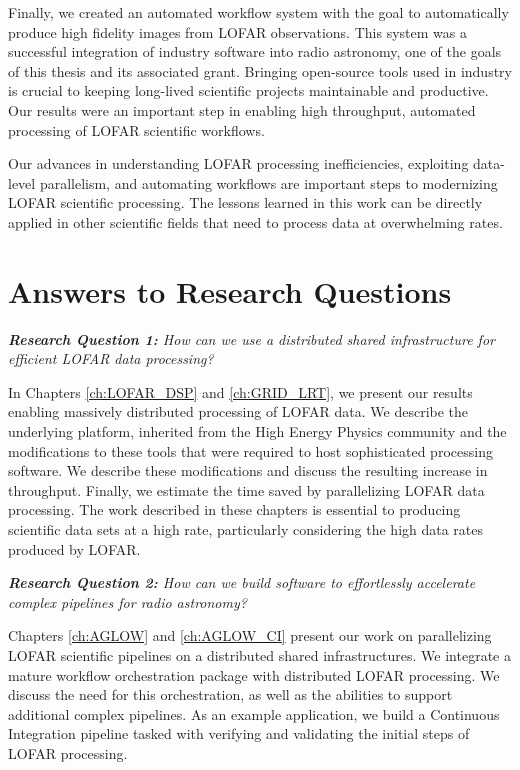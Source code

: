 Finally, we created an automated workflow system with the goal to automatically produce high fidelity images from LOFAR observations. This system was a successful integration of industry software into radio astronomy, one of the goals of this thesis and its associated grant. Bringing open-source tools used in industry is crucial to keeping long-lived scientific projects maintainable and productive. Our results were an important step in enabling high throughput, automated processing of LOFAR scientific workflows. 

Our advances in understanding LOFAR processing inefficiencies, exploiting data-level parallelism, and automating workflows are important steps to modernizing LOFAR scientific processing. The lessons learned in this work can be directly applied in other scientific fields that need to process data at overwhelming rates. 

\section{Answers to Research Questions}


\begin{addmargin}[4em]{8em}%
    \emph{\textbf{Research Question 1:} How can we use a distributed shared infrastructure for efficient LOFAR data processing?}
\end{addmargin}

In Chapters \ref{ch:LOFAR_DSP} and \ref{ch:GRID_LRT}, we present our results enabling massively distributed processing of LOFAR data. We describe the underlying platform, inherited from the High Energy Physics community and the modifications to these tools that were required to host sophisticated processing software. We describe these modifications and discuss the resulting increase in throughput. Finally, we estimate the time saved by parallelizing LOFAR data processing. The work described in these chapters is essential to producing scientific data sets at a high rate, particularly considering the high data rates produced by LOFAR. 


\begin{addmargin}[4em]{8em}%
    \emph{\textbf{Research Question 2:}  How can we build software to effortlessly accelerate complex pipelines for radio astronomy?} 
\end{addmargin}

Chapters \ref{ch:AGLOW} and \ref{ch:AGLOW_CI} present our work on parallelizing LOFAR scientific pipelines on a distributed shared infrastructures. We integrate a mature workflow orchestration package with distributed LOFAR processing. We discuss the need for this orchestration, as well as the abilities to support additional complex pipelines. As an example application, we build a Continuous Integration pipeline tasked with verifying and validating the initial steps of LOFAR processing. 


